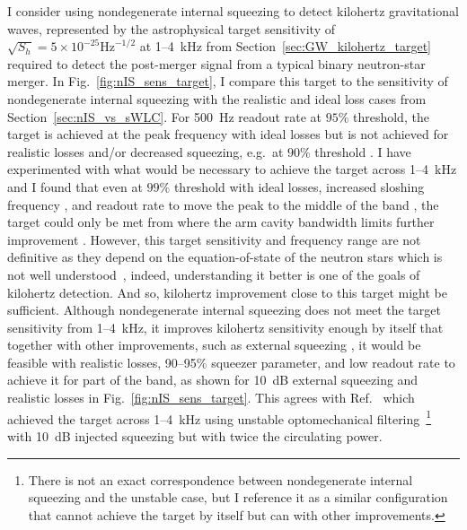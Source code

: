 I consider using nondegenerate internal squeezing to detect kilohertz gravitational waves, represented by the astrophysical target sensitivity of $\sqrt{S_h}=5\times10^{-25}\text{Hz}^{-1/2}$ at 1--4~kHz from Section~\ref{sec:GW_kilohertz_target} required to detect the post-merger signal from a typical binary neutron-star merger. In Fig.~\ref{fig:nIS_sens_target}, I compare this target to the sensitivity of nondegenerate internal squeezing with the realistic and ideal loss cases from Section~\ref{sec:nIS_vs_sWLC}. 
For 500~Hz readout rate at $95\%$ threshold, the target is achieved at the peak frequency  with ideal losses but is not achieved for realistic losses  and/or decreased squeezing, e.g.\ at $90\%$ threshold . I have experimented with what would be necessary to achieve the target across 1--4~kHz and I found that even at $99\%$ threshold with ideal losses, increased sloshing frequency , and readout rate to move the peak to the middle of the band , the target could only be met from  where the arm cavity bandwidth limits further improvement . 
However, this target sensitivity and frequency range are not definitive as they depend on the equation-of-state of the neutron stars which is not well understood~\cite{}, indeed, understanding it better is one of the goals of kilohertz detection. And so, kilohertz improvement close to this target might be sufficient.
Although nondegenerate internal squeezing does not meet the target sensitivity from 1--4~kHz, it improves kilohertz sensitivity enough by itself that together with other improvements, such as external squeezing , it would be feasible with realistic losses, 90--95$\%$ squeezer parameter, and low readout rate  to achieve it for part of the band, as shown for 10~dB external squeezing  and realistic losses in Fig.~\ref{fig:nIS_sens_target}. This agrees with Ref.~\cite{miaoDesignGravitationalWaveDetectors2018} which achieved the target across 1--4~kHz using unstable optomechanical filtering~\footnote{There is not an exact correspondence between nondegenerate internal squeezing and the unstable case, but I reference it as a similar configuration that cannot achieve the target by itself but can with other improvements.} with 10~dB injected squeezing but with twice the circulating power. %
